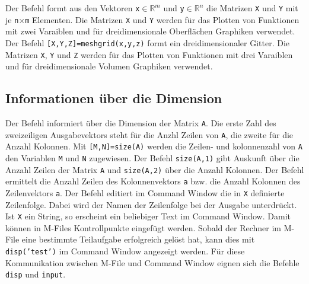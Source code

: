 \newline\newline
Der Befehl  formt aus den Vektoren \texttt{x$\in\mathbb{R}^m$} und \texttt{y$\in\mathbb{R}^n$} die Matrizen \texttt{X} und \texttt{Y} mit je \texttt{n$\times$m} Elementen. Die Matrizen \texttt{X} und \texttt{Y} werden für das Plotten von Funktionen mit zwei Varaiblen und für dreidimensionale Oberflächen Graphiken verwendet.
\newline\newline
Der Befehl {\color{red}\texttt{[X,Y,Z]=meshgrid(x,y,z)}} formt ein dreidimensionaler Gitter. Die Matrizen \texttt{X}, \texttt{Y} und \texttt{Z} werden für das Plotten von Funktionen mit drei Varaiblen und für dreidimensionale Volumen Graphiken verwendet.
\subsection{Informationen über die Dimension}
Der Befehl  informiert über die Dimension der Matrix \texttt{A}. Die erste Zahl des zweizeiligen Ausgabevektors steht für die Anzhl Zeilen von \texttt{A}, die zweite für die Anzahl Kolonnen. Mit {\color{red}\texttt{[M,N]=size(A)}} werden die Zeilen- und kolonnenzahl von \texttt{A} den Variablen \texttt{M} und \texttt{N} zugewiesen. Der Befehl {\color{red}\texttt{size(A,1)}} gibt Auskunft über die Anzahl Zeilen der Matrix \texttt{A} und {\color{red}\texttt{size(A,2)}} über die Anzahl Kolonnen.
\newline\newline
Der Befehl  ermittelt die Anzahl Zeilen des Kolonnenvektors \texttt{a} bzw. die Anzahl Kolonnen des Zeilenvektors \texttt{a}.
\newline\newline
Der Befehl  editiert im Command Window die in \texttt{X} definierte Zeilenfolge. Dabei wird der Namen der Zeilenfolge bei der Ausgabe unterdrückt. Ist \texttt{X} ein String, so erscheint ein beliebiger Text im Command Window. Damit können in M-Files Kontrollpunkte eingefügt werden. Sobald der Rechner im M-File eine bestimmte Teilaufgabe erfolgreich gelöst hat, kann dies mit {\color{red}\texttt{disp('test')}} im Command Window angezeigt werden. Für diese Kommunikation zwischen M-File und Command Window eignen sich die Befehle \texttt{disp} und \texttt{input}.
